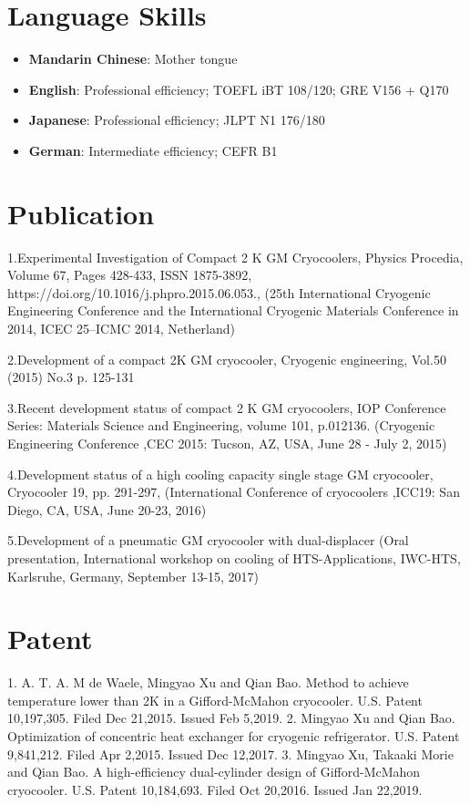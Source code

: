 \documentclass[letterpaper,11pt]{article}
\newcommand{\resumeItem}[2]{
  \item\small{
    \textbf{#1}{: #2 \vspace{-2pt}}
  }
}
\newcommand{\resumeSubItem}[2]{\resumeItem{#1}{#2}\vspace{-4pt}}
\newcommand{\resumeSubHeadingListStart}{\begin{itemize}[leftmargin=*]}
\newcommand{\resumeSubHeadingListEnd}{\end{itemize}}
\begin{document}
\section{Language Skills}
\resumeSubHeadingListStart
  \resumeSubItem{Mandarin Chinese}{Mother tongue}
  \resumeSubItem{English}{Professional efficiency; TOEFL iBT 108/120; GRE V156 + Q170}
  \resumeSubItem{Japanese}{Professional efficiency; JLPT N1 176/180}
  \resumeSubItem{German}{Intermediate efficiency; CEFR B1}
\resumeSubHeadingListEnd


\section{Publication}
1.Experimental Investigation of Compact 2 K GM Cryocoolers, Physics Procedia, Volume 67, Pages 428-433, ISSN 1875-3892,
https://doi.org/10.1016/j.phpro.2015.06.053., (25th International Cryogenic Engineering Conference and the International Cryogenic Materials Conference in 2014, ICEC 25–ICMC 2014, Netherland)

2.Development of a compact 2K GM cryocooler, Cryogenic engineering, Vol.50 (2015) No.3 p. 125-131

3.Recent development status of compact 2 K GM cryocoolers,
IOP Conference Series: Materials Science and Engineering,
volume 101,
p.012136.
(Cryogenic Engineering Conference ,CEC 2015: Tucson, AZ, USA, June 28 - July 2, 2015)

4.Development status of a high cooling capacity single stage GM cryocooler,
Cryocooler 19,
pp. 291-297,
(International Conference of cryocoolers ,ICC19: San Diego, CA, USA, June 20-23, 2016)

5.Development of a pneumatic GM cryocooler with dual-displacer (Oral presentation, International workshop on cooling of HTS-Applications, IWC-HTS, Karlsruhe, Germany, September 13-15, 2017)

\section{Patent}
1. A. T. A. M de Waele, Mingyao Xu and Qian Bao. Method to achieve temperature lower than 2K in a Gifford-McMahon cryocooler. U.S. Patent 10,197,305. Filed Dec 21,2015. Issued Feb 5,2019.
2. Mingyao Xu and Qian Bao. Optimization of concentric heat exchanger for cryogenic refrigerator. U.S. Patent 9,841,212. Filed Apr 2,2015. Issued Dec 12,2017.
3. Mingyao Xu, Takaaki Morie and Qian Bao. A high-efficiency dual-cylinder design of Gifford-McMahon cryocooler. U.S. Patent 10,184,693. Filed Oct 20,2016. Issued Jan 22,2019.
\end{document}
